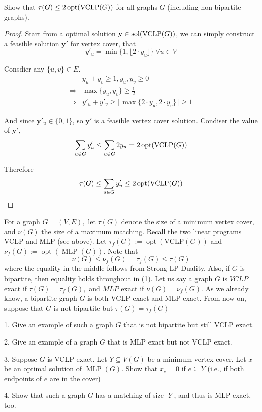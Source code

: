 \documentclass[11pt,a4paper,oneside]{article}
\newcommand{\y}{\mathbf{y}}
\newcommand{\sol}{\textup{\textrm{sol}}}
\newcommand{\opt}{\textup{\textrm{opt}}}
\begin{document}
\begin{problem}{3}
	\statement
     Show that $\tau(G) \leq 2\, \opt(\textrm{VCLP}(G))$ for all graphs $G$ (including non-bipartite graphs).
  
    \solution
    \begin{proof}
      Start from a optimal solution $\y \in \sol(\textrm{VCLP}(G))$, we can simply construct a feasible solution $\y'$ for vertex cover, that 
      $$ y'_u = \min\{1,\lfloor 2 \cdot y_u \rfloor\} ~ \forall u \in V$$
      
      Consdier any $\{u, v\} \in E$.
      \begin{align*}
        &y_u + y_v \geq 1, y_u, y_v \geq 0 \\
      \Rightarrow& \max \{y_u, y_v\} \geq \frac 12 \\
      \Rightarrow& y'_u + y'_v \geq \lceil \max \{2\cdot y_u, 2\cdot y_v\} \rceil \geq 1\end{align*}
      
      And since $\y'_u \in \{0, 1\}$, so $\y'$ is a feasible vertex cover solution. Condiser the value of $\y'$,
      $$ \sum_{u \in G}y'_u \leq \sum_{u \in G} 2y_u = 2\, \opt(\textrm{VCLP}(G))$$
      
      Therefore $$\tau(G) \leq \sum_{u \in G}y'_u \leq  2\, \opt(\textrm{VCLP}(G))$$
    
    \end{proof}
    
\end{problem}




\begin{problem}{4}
	\statement
    For a graph $G=(V, E),$ let $\tau(G)$ denote the size of a minimum vertex cover, and $\nu(G)$ the size of a maximum matching. Recall the two linear programs VCLP and MLP (see above). Let $\tau_{f}(G):=\operatorname{opt}(\mathrm{VCLP}(G))$ and $\nu_{f}(G):=\operatorname{opt}(\operatorname{MLP}(G)) .$ Note that
		\[
		\nu(G) \leq \nu_{f}(G)=\tau_{f}(G) \leq \tau(G)
		\]
		where the equality in the middle follows from Strong LP Duality. Also, if $G$ is bipartite, then equality holds throughout in (1). Let us say a graph $G$ is $V C L P$ exact if $\tau(G)=\tau_{f}(G),$ and $M L P$ exact if $\nu(G)=\nu_{f}(G) .$ As we already know, a bipartite graph $G$ is both VCLP exact and MLP exact. From now on, suppose that $G$ is not bipartite but $\tau(G)=\tau_{f}(G)$
		
		1. Give an example of such a graph $G$ that is not bipartite but still VCLP exact.
		
		2. Give an example of a graph $G$ that is MLP exact but not VCLP exact.
		
		3. Suppose $G$ is VCLP exact. Let $Y \subseteq V(G)$ be a minimum vertex cover. Let $x$ be an optimal solution of $\operatorname{MLP}(G) .$ Show that $x_{e}=0$ if $e \subseteq Y$ (i.e., if both endpoints of $e$ are in the cover)
		
		4. Show that such a graph $G$ has a matching of size $|Y|$, and thus is MLP exact, too.
    
    \solution
\end{problem}
\end{document}
